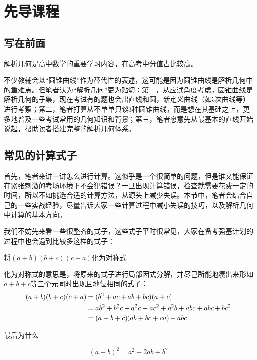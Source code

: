 \chapter{先导课程}
\section{写在前面}
解析几何是高中数学的重要学习内容，在高考中分值占比较高。

不少教辅会以“圆锥曲线”作为替代性的表述，这可能是因为圆锥曲线是解析几何中的重难点。但笔者认为“解析几何”更为贴切：第一，从应试角度考虑，圆锥曲线是解析几何的子集，现在考试有的题也会出直线和圆，新定义曲线（如3次曲线等）进行考察；第二，笔者打算从不单单只谈3种圆锥曲线，而是想在其基础之上，更多地普及一些考试常用的几何知识和背景；第三，笔者愿意先从最基本的直线开始说起，帮助读者搭建完整的解析几何体系。

\section{常见的计算式子}
首先，笔者来讲一讲怎么进行计算。这似乎是一个很简单的问题，但是谁又能保证在紧张刺激的考场环境下不会犯错误？一旦出现计算错误，检查就需要花费一定的时间，所以不如挑选合适的计算方法，从源头上减少失误。本节中，笔者会结合自己的一些实战经验，尽量告诉大家一些计算过程中减小失误的技巧，以及解析几何中计算的基本方向。

我们不妨先来看一些很整齐的式子，这些式子平时很常见，大家在备考强基计划的过程中也会遇到比较多这样的式子：
\begin{example}{}{}
    将$(a+b)(b+c)(c+a)$化为对称式
\end{example}
\begin{solution}
    化为对称式的意思是，将原来的式子进行局部因式分解，并尽己所能地凑出来形如$a+b+c$等三个元同时出现且地位相同的式子：\vspace{-10pt}
    \begin{align*}
    \vspace{-15pt}
    (a+b)(b+c)(c+a)&=(b^2+ac+ab+bc)(a+c)\\
    &=ab^2+b^2c+a^2c+ac^2+a^2b+abc+abc+bc^2\\
    &=(a+b+c)(ab+bc+ca)-abc
    \vspace{-10pt}
    \end{align*}
\end{solution}
最后为什么
\begin{theorem}{}{}
    $$(a+b)^2=a^2+2ab+b^2$$
\end{theorem}